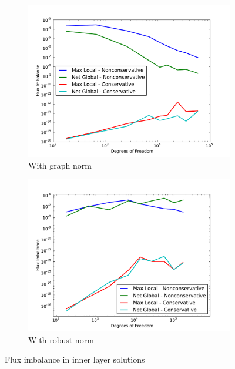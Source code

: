 \documentclass[letterpaper]{article}
\begin{document}
\begin{figure}
\centering
\begin{subfigure}[t]{0.45\textwidth}
\centering
\includegraphics[width=\textwidth]{figs/InnerLayer/graphFlux.pdf}
\caption{With graph norm}
\label{fig:innerlayerGraphFlux}
\end{subfigure}
\begin{subfigure}[t]{0.45\textwidth}
\centering
\includegraphics[width=\textwidth]{figs/InnerLayer/robustFlux.pdf}
\caption{With robust norm}
\label{fig:innerlayerRobustFlux}
\end{subfigure}
\caption{Flux imbalance in inner layer solutions}
\label{fig:innerlayer_flux}
\end{figure}
\end{document}
